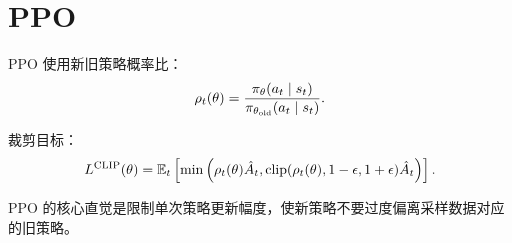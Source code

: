 \section{PPO}

PPO 使用新旧策略概率比：
\[
  \rho_t(\theta)=
  \frac{\pi_{\theta}(a_t\mid s_t)}
       {\pi_{\theta_{\mathrm{old}}}(a_t\mid s_t)}.
\]

裁剪目标：
\[
  L^{\mathrm{CLIP}}(\theta)=
  \mathbb{E}_t\left[
    \min\left(
      \rho_t(\theta)\hat{A}_t,
      \operatorname{clip}(\rho_t(\theta),1-\epsilon,1+\epsilon)\hat{A}_t
    \right)
  \right].
\]

\begin{keybox}
PPO 的核心直觉是限制单次策略更新幅度，使新策略不要过度偏离采样数据对应的旧策略。
\end{keybox}
